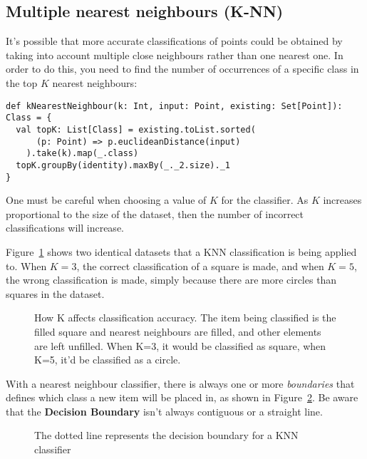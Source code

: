 \subsection{Multiple nearest neighbours (K-NN)}

It's possible that more accurate classifications of points could be obtained by
taking into account multiple close neighbours rather than one nearest one. In
order to do this, you need to find the number of occurrences of a specific class
in the top $K$ nearest neighbours:


\begin{lstlisting}[label=nearestNeighbour, caption=Scala Nearest Neighbour]
def kNearestNeighbour(k: Int, input: Point, existing: Set[Point]): Class = {
  val topK: List[Class] = existing.toList.sorted(
      (p: Point) => p.euclideanDistance(input)
    ).take(k).map(_.class)
  topK.groupBy(identity).maxBy(_._2.size)._1
}
\end{lstlisting}

One must be careful when choosing a value of $K$ for the classifier. As $K$
increases proportional to the size of the dataset, then the number of incorrect
classifications will increase.

Figure~\ref{fig:knn-large} shows two identical datasets that a KNN
classification is being applied to. When $K = 3$, the correct classification of
a square is made, and when $K = 5$, the wrong classification is made, simply
because there are more circles than squares in the dataset.

\begin{figure}[!h]
  
  \caption{How K affects classification accuracy. The item being classified is
  the filled square and nearest neighbours are filled, and other elements are
  left unfilled. When K=3, it would be classified as square, when K=5, it'd be
  classified as a circle.}
  \label{fig:knn-large}
\end{figure}

With a nearest neighbour classifier, there is always one or more
\textit{boundaries} that defines which class a new item will be placed in, as
shown in Figure~\ref{fig:knn-boundary}. Be aware that the \textbf{Decision
Boundary} isn't always contiguous or a straight line.

\begin{figure}[!h]
  \centering
  
  \caption{The dotted line represents the decision boundary for a KNN
  classifier}
  \label{fig:knn-boundary}
\end{figure}

